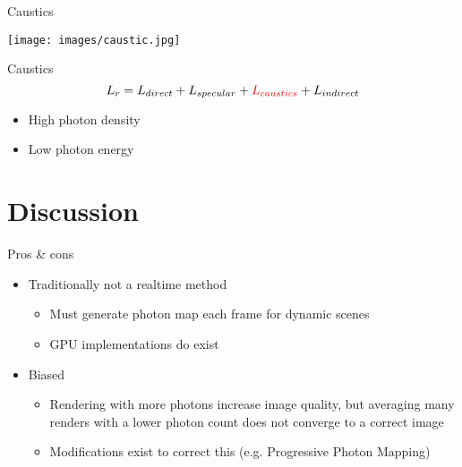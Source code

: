 \documentclass{beamer}
\begin{document}
      \begin{frame}{Caustics}
        \begin{center} \texttt{[image: images/caustic.jpg]} \end{center}
      \end{frame}
      
      \begin{frame}{Caustics}
        \[
          L_r = L_{direct} + L_{specular} + {\color{red} L_{caustics}} + L_{indirect}
        \]

        \begin{itemize}
          \item<2-> High photon density
          \item<3-> Low photon energy
        \end{itemize}

      \end{frame}

  \section{Discussion}
    \begin{frame}{Pros \& cons}
        \begin{itemize}
          \item<2-> Traditionally not a realtime method
            \begin{itemize}
              \item<3-> Must generate photon map each frame for dynamic scenes
              \item<4-> GPU implementations do exist
            \end{itemize}
          \item<5-> Biased
            \begin{itemize}
              \item<6-> Rendering with more photons increase image quality, but averaging many renders with a lower photon count does not converge to a correct image
              \item<7-> Modifications exist to correct this (e.g. Progressive Photon Mapping)
            \end{itemize}
        \end{itemize}
    \end{frame}
\end{document}
